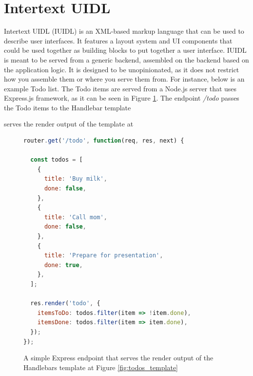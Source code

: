 
\section{Intertext UIDL} \label{intertextUIDL}

Intertext UIDL (IUIDL) is an XML-based markup language that can be used to describe user interfaces. It features a layout system and UI components that could be used together as building blocks to put together a user interface. IUIDL is meant to be served from a generic backend, assembled on the backend based on the application logic. It is designed to be unopinionated, as it does not restrict how you assemble them or where you serve them from. For instance, below is an example Todo list. The Todo items are served from a Node.js server that uses Express.js framework, as it can be seen in Figure \ref{fig:todos_js}. The endpoint \textit{/todo} passes the Todo items to the Handlebar template

serves the render output of the template at 

\begin{figure}[H]
\begin{minipage}{\linewidth}
\begin{lstlisting}[language=javascript]
router.get('/todo', function(req, res, next) {

  const todos = [
    {
      title: 'Buy milk',
      done: false,
    },
    {
      title: 'Call mom',
      done: false,
    },
    {
      title: 'Prepare for presentation',
      done: true,
    },
  ];

  res.render('todo', {
    itemsToDo: todos.filter(item => !item.done),
    itemsDone: todos.filter(item => item.done),
  });
});
\end{lstlisting}
\end{minipage}
\caption{A simple Express endpoint that serves the render output of the Handlebars template at Figure \ref{fig:todos_template}}%
\label{fig:todos_js}%
\end{figure}


